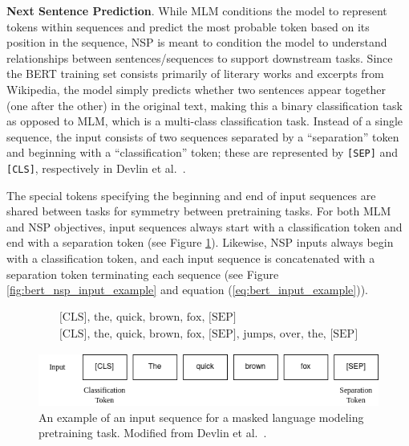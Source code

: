 \documentclass[12pt]{article}
\begin{document}
\textbf{Next Sentence Prediction}. While MLM conditions the model to represent tokens within sequences and predict the most probable token based on its position in the sequence, NSP is meant to condition the model to understand relationships between sentences/sequences to support downstream tasks. Since the BERT training set consists primarily of literary works and excerpts from Wikipedia, the model simply predicts whether two sentences appear together (one after the other) in the original text, making this a binary classification task as opposed to MLM, which is a multi-class classification task. Instead of a single sequence, the input consists of two sequences separated by a ``separation'' token and beginning with a ``classification'' token; these are represented by \lstinline|[SEP]| and \lstinline|[CLS]|, respectively in Devlin et al.~\cite{devlin_bert_2019}.

The special tokens specifying the beginning and end of input sequences are shared between tasks for symmetry between pretraining tasks. For both MLM and NSP objectives, input sequences always start with a classification token and end with a separation token (see Figure \ref{fig:bert_mlm_input_example}). Likewise, NSP inputs always begin with a classification token, and each input sequence is concatenated with a separation token terminating each sequence (see Figure \ref{fig:bert_nsp_input_example} and equation (\ref{eq:bert_input_example})).

\begin{equation}\label{eq:bert_input_example}
    \begin{gathered}
        \mbox{[CLS], the, quick, brown, fox, [SEP]}\\
        \mbox{[CLS], the, quick, brown, fox, [SEP], jumps, over, the, [SEP]}
    \end{gathered}
\end{equation}

\begin{figure}[!t]
    \includegraphics[width=\linewidth]{figures/BERT_MLM_input.png}
    \caption{An example of an input sequence for a masked language modeling pretraining task. Modified from Devlin et al.~\cite{devlin_bert_2019}.}
    \label{fig:bert_mlm_input_example}
\end{figure}
\end{document}
